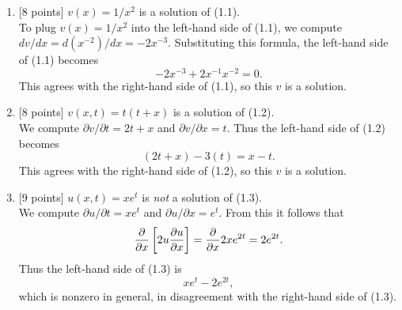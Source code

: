 \begin{solution}
\begin{enumerate}
\item {[8 points]} $v(x) = 1/x^2$ is a solution of (1.1).\\      
      To plug $v(x) = 1/x^2$ into the left-hand side of (1.1), we compute
      $dv/dx = d(x^{-2})/dx = -2x^{-3}$.  Substituting this formula,
      the left-hand side of (1.1) becomes 
           \[ -2x^{-3} + 2x^{-1}x^{-2} = 0.\]
      This agrees with the right-hand side of (1.1), so this $v$ is a solution.
\\
\item {[8 points]} $v(x,t) = t(t+x)$ is a solution of (1.2).\\
      We compute $\partial v/\partial t =  2t+x$ and
                 $\partial v/\partial x = t$.
      Thus the left-hand side of (1.2) becomes
        \[ (2t+x) - 3(t) = x-t.\]
      This agrees with the right-hand side of (1.2), so this $v$ is a solution.
\\
\item {[9 points]} $u(x,t) = x e^t$ is \emph{not} a solution of (1.3).\\
       We compute $\partial u /\partial t = xe^t$ and 
       $\partial u/\partial x = e^t$.
       From this it follows that 
           \[ {\partial\over \partial x} \left[ 2u {\partial u\over \partial x}\right]
                = {\partial \over \partial x} 2xe^{2t} = 2e^{2t}.\]
       Thus the left-hand side of (1.3) is
            \[ xe^t -2e^{2t},\]
       which is nonzero in general, in disagreement with the right-hand side of (1.3).
\end{enumerate}
\end{solution}